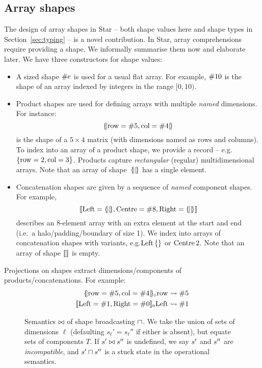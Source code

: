 \subsection{Array shapes}
\label{subsec:array-shapes}

The design of array shapes in Star -- both shape values here and shape types in Section~\ref{sec:typing} -- is a novel contribution.
In Star, array comprehensions require providing a shape.
We informally summarise them now and elaborate later. 
We have three constructors for shape values:
\begin{itemize}
    \item A sized shape $\#{e}$ is used for a usual flat array. For example, $\#{10}$ is the shape of an array indexed by integers in the range $[ 0, 10)$.
    \item Product shapes are used for defining arrays with multiple \textit{named} dimensions. For instance: 
    $$\sproductval{\mathrm{row} = \ssize{5}, \mathrm{col} = \ssize{4}}$$ 
    is the shape of a $5 \times 4$ matrix (with dimensions named as rows and columns). To index into an array of a product shape, we provide a record -- e.g.\@ $\srecordval{\mathrm{row} = 2, \mathrm{col} = 3}$.
    Products capture \textit{rectangular} (regular) multidimensional arrays.
    Note that an array of shape~$\sproductval{}$ has a single element.
    \item Concatenation shapes are given by a sequence of \textit{named} component shapes. For example,
    $$\sconcatval{ \mathrm{Left}= \sproductval{}, \mathrm{Centre}= \ssize{8}, \mathrm{Right}= \sproductval{} }$$
    describes an 8-element array with an extra element at the start and end (i.e.\ a halo/padding/boundary of size 1). We index into arrays of concatenation shapes with variants, e.g.\@ $\stag{\mathrm{Left}}{\srecordval{}}$ or ${\mathrm{Centre}}\,{2}$.
    Note that an array of shape $\sconcatval{}$ is empty.
\end{itemize}
Projections on shapes extract dimensions/components of products/concatenations. For example: 
\begin{align*}
\sproductproj{ \sproductval{\mathrm{row} = \ssize{5}, \mathrm{col} = \ssize{4}}}{\mathrm{row}} &\step \ssize 5 \\
\sconcatproj{\sconcatval{ \mathrm{Left}= \ssize{1}, \mathrm{Right}= \ssize{0}}}{\mathrm{Left}} &\step \ssize 1
\end{align*}

\begin{figure}
    \centering
    
    \caption{
        Semantics $\bowtie$ of shape broadcasting $\sqcap$. 
        We take the union of sets of dimensions $\ell$ (defaulting $s_\ell' = s_\ell''$ if either is absent), but equate sets of components $T$. 
        If $s' \bowtie s''$ is undefined, we say $s'$ and $s''$ are \emph{incompatible}, and ${s'} \sqcap {s''}$ is a stuck state in the operational semantics.
    }
    \label{fig:broadcasting}
\end{figure}

